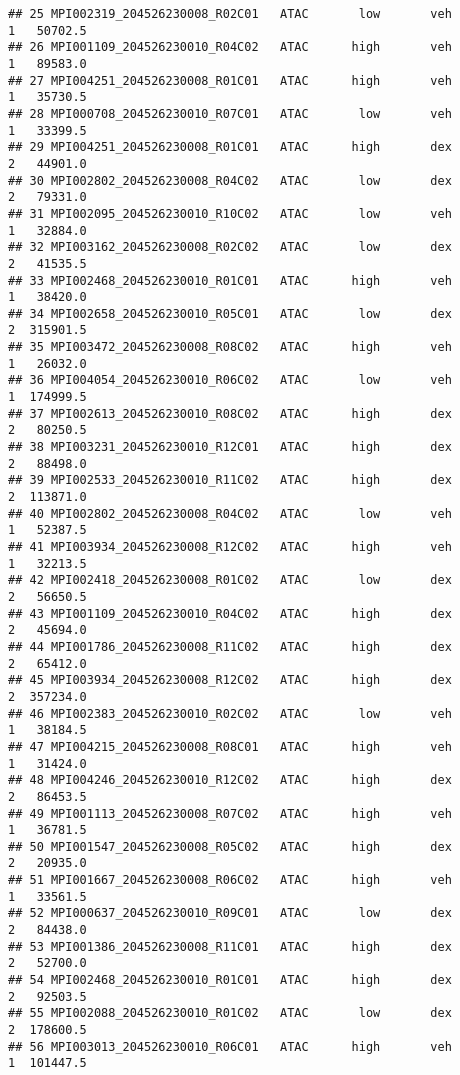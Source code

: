 \documentclass[
]{article}
\begin{document}
\begin{verbatim}
## 25 MPI002319_204526230008_R02C01   ATAC       low       veh         1   50702.5
## 26 MPI001109_204526230010_R04C02   ATAC      high       veh         1   89583.0
## 27 MPI004251_204526230008_R01C01   ATAC      high       veh         1   35730.5
## 28 MPI000708_204526230010_R07C01   ATAC       low       veh         1   33399.5
## 29 MPI004251_204526230008_R01C01   ATAC      high       dex         2   44901.0
## 30 MPI002802_204526230008_R04C02   ATAC       low       dex         2   79331.0
## 31 MPI002095_204526230010_R10C02   ATAC       low       veh         1   32884.0
## 32 MPI003162_204526230008_R02C02   ATAC       low       dex         2   41535.5
## 33 MPI002468_204526230010_R01C01   ATAC      high       veh         1   38420.0
## 34 MPI002658_204526230010_R05C01   ATAC       low       dex         2  315901.5
## 35 MPI003472_204526230008_R08C02   ATAC      high       veh         1   26032.0
## 36 MPI004054_204526230010_R06C02   ATAC       low       veh         1  174999.5
## 37 MPI002613_204526230010_R08C02   ATAC      high       dex         2   80250.5
## 38 MPI003231_204526230010_R12C01   ATAC      high       dex         2   88498.0
## 39 MPI002533_204526230010_R11C02   ATAC      high       dex         2  113871.0
## 40 MPI002802_204526230008_R04C02   ATAC       low       veh         1   52387.5
## 41 MPI003934_204526230008_R12C02   ATAC      high       veh         1   32213.5
## 42 MPI002418_204526230008_R01C02   ATAC       low       dex         2   56650.5
## 43 MPI001109_204526230010_R04C02   ATAC      high       dex         2   45694.0
## 44 MPI001786_204526230008_R11C02   ATAC      high       dex         2   65412.0
## 45 MPI003934_204526230008_R12C02   ATAC      high       dex         2  357234.0
## 46 MPI002383_204526230010_R02C02   ATAC       low       veh         1   38184.5
## 47 MPI004215_204526230008_R08C01   ATAC      high       veh         1   31424.0
## 48 MPI004246_204526230010_R12C02   ATAC      high       dex         2   86453.5
## 49 MPI001113_204526230008_R07C02   ATAC      high       veh         1   36781.5
## 50 MPI001547_204526230008_R05C02   ATAC      high       dex         2   20935.0
## 51 MPI001667_204526230008_R06C02   ATAC      high       veh         1   33561.5
## 52 MPI000637_204526230010_R09C01   ATAC       low       dex         2   84438.0
## 53 MPI001386_204526230008_R11C01   ATAC      high       dex         2   52700.0
## 54 MPI002468_204526230010_R01C01   ATAC      high       dex         2   92503.5
## 55 MPI002088_204526230010_R01C02   ATAC       low       dex         2  178600.5
## 56 MPI003013_204526230010_R06C01   ATAC      high       veh         1  101447.5

\end{verbatim}
\end{document}

